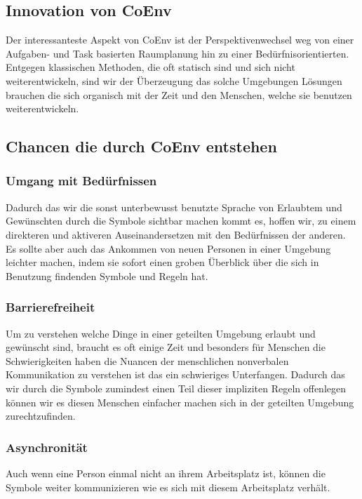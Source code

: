 \documentclass{article}
\begin{document}
\subsection{Innovation von CoEnv}

Der interessanteste Aspekt von CoEnv ist der Perspektivenwechsel weg von einer Aufgaben- und Task basierten Raumplanung hin zu einer Bedürfnisorientierten. Entgegen klassischen Methoden, die oft statisch sind und sich nicht weiterentwickeln, sind wir der Überzeugung das solche Umgebungen Lösungen brauchen die sich organisch mit der Zeit und den Menschen, welche sie benutzen weiterentwickeln. 

\subsection{Chancen die durch CoEnv entstehen}

\subsubsection*{Umgang mit Bedürfnissen}
Dadurch das wir die sonst unterbewusst benutzte Sprache von Erlaubtem und Gewünschten durch die Symbole sichtbar machen kommt es, hoffen wir, zu einem direkteren und aktiveren Auseinandersetzen mit den Bedürfnissen der anderen. Es sollte aber auch das Ankommen von neuen Personen in einer Umgebung leichter machen, indem sie sofort einen groben Überblick über die sich in Benutzung findenden Symbole und Regeln hat.
\subsubsection*{Barrierefreiheit}
Um zu verstehen welche Dinge in einer geteilten Umgebung erlaubt und gewünscht sind, braucht es oft einige Zeit und besonders für Menschen die Schwierigkeiten haben die Nuancen der menschlichen nonverbalen Kommunikation zu verstehen ist das ein schwieriges Unterfangen. Dadurch das wir durch die Symbole zumindest einen Teil dieser impliziten Regeln offenlegen können wir es diesen Menschen einfacher machen sich in der geteilten Umgebung zurechtzufinden.
\subsubsection*{Asynchronität}
Auch wenn eine Person einmal nicht an ihrem Arbeitsplatz ist, können die Symbole weiter kommunizieren wie es sich mit diesem Arbeitsplatz verhält.
\end{document}
